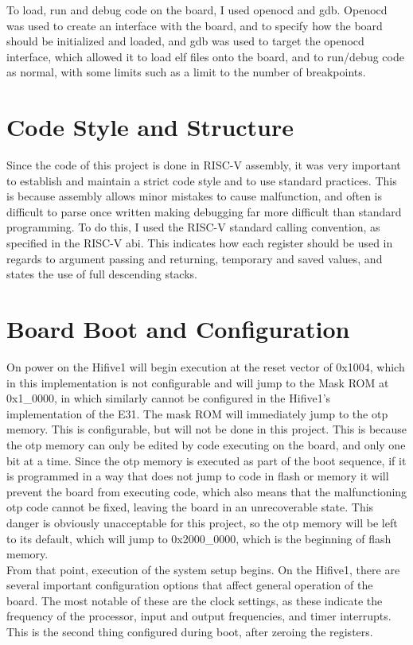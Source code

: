 To load, run and debug code on the board, I used openocd and gdb. Openocd was used to create an interface with the board, and to specify how the board should be initialized and loaded, and gdb was used to target the openocd interface, which allowed it to load elf files onto the board, and to run/debug code as normal, with some limits such as a limit to the number of breakpoints.
\section{Code Style and Structure}
Since the code of this project is done in RISC-V assembly, it was very important to establish and maintain a strict code style and to use standard practices. This is because assembly allows minor mistakes to cause malfunction, and often is difficult to parse once written making debugging far more difficult than standard programming. To do this, I used the RISC-V standard calling convention, as specified in the RISC-V \ac{abi}. This indicates how each register should be used in regards to argument passing and returning, temporary and saved values, and states the use of full descending stacks\cite{riscv_abi}.

\section{Board Boot and Configuration}
On power on the Hifive1 will begin execution at the reset vector of 0x1004, which in this implementation is not configurable and will jump to the Mask ROM at 0x1\_0000, in which similarly cannot be configured in the Hifive1's implementation of the E31. The mask ROM will immediately jump to the \ac{otp} memory. This is configurable, but will not be done in this project. This is because the \ac{otp} memory can only be edited by code executing on the board, and only one bit at a time. Since the \ac{otp} memory is executed as part of the boot sequence, if it is programmed in a way that does not jump to code in flash or memory it will prevent the board from executing code, which also means that the malfunctioning \ac{otp} code cannot be fixed, leaving the board in an unrecoverable state. This danger is obviously unacceptable for this project, so the \ac{otp} memory will be left to its default, which will jump to 0x2000\_0000, which is the beginning of flash memory.\\
From that point, execution of the system setup begins.
On the Hifive1, there are several important configuration options that affect general operation of the board. The most notable of these are the clock settings, as these indicate the frequency of the processor, input and output frequencies, and timer interrupts. This is the second thing configured during boot, after zeroing the registers.


